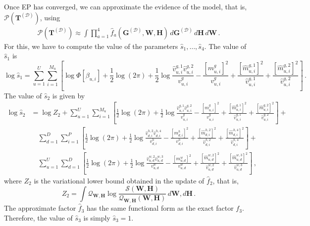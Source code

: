 Once EP has converged, we can approximate the evidence of the model, that is, $\mathcal{P}(\mathbf{T}^{(\mathcal{D})})$, using
\begin{align}
\mathcal{P}(\mathbf{T}^{(\mathcal{D})}) \approx \int \prod_{a=1}^4
\hat{f}_a(\mathbf{G}^{(\mathcal{D})},\mathbf{W},\mathbf{H})\,d\mathbf{G}^{(\mathcal{D})}\,d\mathbf{H}\,d\mathbf{W}\,.
\end{align}
For this, we have to compute the value of the parameters $\hat{s}_1,\ldots,\hat{s}_4$. The value of $\hat{s}_1$ is
\begin{equation}
\log\hat{s}_1 = \sum_{u=1}^{U}\sum_{i=1}^{M_u}\left[\log \Phi[\beta_{u,i}] +
\frac{1}{2}\log(2\pi)+\frac{1}{2}\log \frac{\hat{v}_{u,i}^{g,1} \hat{v}_{u,i}^{g,2}}{v_{u,i}^g}-
\frac{[m_{u,i}^g]^2}{v_{u,i}^g}+\frac{[\hat{m}_{u,i}^{g,1}]^2}{\hat{v}_{u,i}^{g,1}}+
\frac{[\hat{m}_{u,i}^{g,2}]^2}{\hat{v}_{u,i}^{g,2}}\right]\,.
\end{equation}
The value of $\hat{s}_2$ is given by
\begin{align}
\log\hat{s}_2 & = \log Z_2 + \sum_{u=1}^{U}\sum_{i=1}^{M_u}\left[\frac{1}{2}\log(2\pi)+
\frac{1}{2}\log \frac{\hat{v}_{u,i}^{g,1}\hat{v}_{u,i}^{g,2}}{v_{u,i}^g}-
\frac{[m_{u,i}^g]^2}{v_{u,i}^g}+\frac{[\hat{m}_{u,i}^{g,1}]^2}{\hat{v}_{u,i}^{g,1}}+
\frac{[\hat{m}_{u,i}^{g,2}]^2}{\hat{v}_{u,i}^{g,2}}\right]+\nonumber\\
& \quad \sum_{d=1}^{D}\sum_{i=1}^{P}\left[\frac{1}{2}\log(2\pi)+
\frac{1}{2}\log \frac{\hat{v}_{d,i}^{h,2}\hat{v}_{d,i}^{h,4}}{v_{d,i}^h}-
\frac{[m_{d,i}^h]^2}{v_{d,i}^h}+\frac{[\hat{m}_{d,i}^{h,2}]^2}{\hat{v}_{d,i}^{h,2}}+
\frac{[\hat{m}_{d,i}^{h,4}]^2}{\hat{v}_{d,i}^{h,4}}\right]+\nonumber\\
& \quad \sum_{u=1}^{U}\sum_{d=1}^{D}\left[\frac{1}{2}\log(2\pi)+
\frac{1}{2}\log \frac{\hat{v}_{u,d}^{w,2}\hat{v}_{u,d}^{w,3}}{v_{u,d}^w}-
\frac{[m_{u,d}^w]^2}{v_{u,d}^w}+\frac{[\hat{m}_{u,d}^{w,2}]^2}{\hat{v}_{u,d}^{w,2}}+
\frac{[\hat{m}_{u,d}^{w,3}]^2}{\hat{v}_{u,d}^{w,3}}\right]\,,
\end{align}
where $Z_2$ is the variational lower bound obtained in the update of $\hat{f}_2$, that is,
\begin{equation}
Z_2 = \int \mathcal{Q}_{\mathbf{W},\mathbf{H}}\log\frac{\mathcal{S}(\mathbf{W},\mathbf{H})}
{\mathcal{Q}_{\mathbf{W},\mathbf{H}}(\mathbf{W},\mathbf{H})} \,d\mathbf{W},d\mathbf{H}\,.
\end{equation}
The approximate factor $\hat{f}_{3}$ has the same functional form as the exact factor $f_3$.
Therefore, the value of $\hat{s}_3$ is simply $\hat{s}_3 = 1$.
